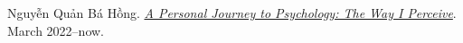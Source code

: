 \documentclass[oneside]{book}
\numberwithin{equation}{section}
\begin{document}


\begin{thebibliography}{99}
	  Nguyễn Quản Bá Hồng. \href{https://github.com/NQBH/hobby/blob/master/psychology/NQBH_a_personal_journey_to_psychology.pdf}{\textit{A Personal Journey to Psychology: The Way I Perceive}}. March 2022--now.
\end{thebibliography}


\printbibliography[heading=bibintoc]
	
\end{document}
